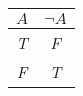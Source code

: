 
\begin{center}
\begin{tabular}{c ||c}
 $A$ & $\lnot A$ \\
\hline
 \emph{T}  &  \emph{F}\\
 \emph{F}  & \emph{T}\\
\end{tabular}
\end{center}

